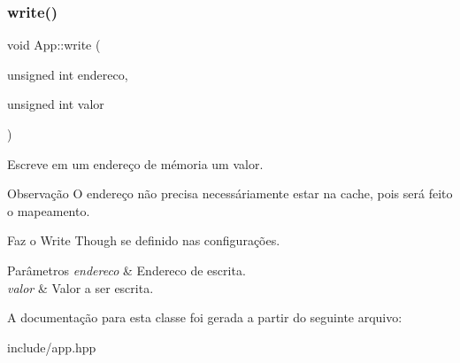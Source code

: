 \subsubsection{\texorpdfstring{write()}{write()}}
{\footnotesize\ttfamily void App\+::write (\begin{DoxyParamCaption}\item[{unsigned int}]{endereco,  }\item[{unsigned int}]{valor }\end{DoxyParamCaption})}



Escreve em um endereço de mémoria um valor. 

\begin{DoxyNote}{Observação}
O endereço não precisa necessáriamente estar na cache, pois será feito o mapeamento. 

Faz o Write Though se definido nas configurações. 
\end{DoxyNote}

\begin{DoxyParams}{Parâmetros}
{\em endereco} & Endereco de escrita. \\
\hline
{\em valor} & Valor a ser escrita. \\
\hline
\end{DoxyParams}


A documentação para esta classe foi gerada a partir do seguinte arquivo\+:\begin{DoxyCompactItemize}
\item 
include/app.\+hpp\end{DoxyCompactItemize}
